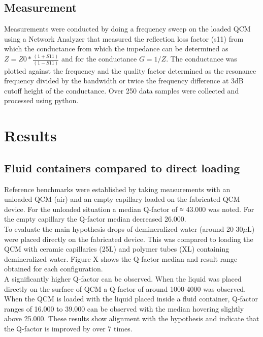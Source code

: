 \documentclass[a4paper, 10pt, conference]{ieeeconf}      %
\begin{document}
\subsection{Measurement}
    Measurements were conducted by doing a frequency sweep on the loaded QCM using a Network Analyzer that measured the reflection loss factor (s11) from which the conductance from which the impedance can be determined as
    $Z = Z0* \frac{(1+S11)}{(1-S11)}$ and for the conductance
    $G= 1/Z$. 
    The conductance was plotted against the frequency and the quality factor determined as the resonance frequency divided by the bandwidth or twice the frequency difference at 3dB cutoff height of the conductance. 
    Over 250 data samples were collected and processed using python. \\
    
\section{Results}
\subsection{Fluid containers compared to direct loading}
    Reference benchmarks were established by taking measurements with an unloaded QCM (air) and an empty capillary loaded on the fabricated QCM device. 
    For the unloaded situation a median Q-factor of ≈ 43.000 was noted. For the empty capillary the Q-factor median decreased  26.000. \\

    To evaluate the main hypothesis drops of demineralized water (around 20-30$\mu$L) were placed directly on the fabricated device. 
    This was compared to loading the QCM with ceramic capillaries (25L) and polymer tubes (XL) containing demineralized water.
    Figure X shows the Q-factor median and result range obtained for each configuration. \\

    A significantly higher Q-factor can be observed.
    When the liquid was placed directly on the surface of QCM a Q-factor of around 1000-4000 was observed.
    When the QCM is loaded with the liquid placed inside a fluid container, Q-factor ranges of 16.000  to 39.000 can be observed with the median hovering slightly above 25.000.
    These results show alignment with the hypothesis and indicate that the Q-factor is improved by over 7 times.\\
\end{document}
